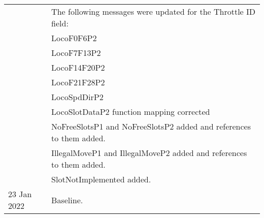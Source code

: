\begin{tabular}{|p{3cm}|p{13cm}|}
& The following messages were updated for the Throttle ID field:\\
&   LocoF0F6P2\\
&   LocoF7F13P2\\
&   LocoF14F20P2\\
&   LocoF21F28P2\\
&   LocoSpdDirP2\\
& LocoSlotDataP2 function mapping corrected\\
& NoFreeSlotsP1 and NoFreeSlotsP2 added and references to them added.\\
& IllegalMoveP1 and IllegalMoveP2 added and references to them added.\\
& SlotNotImplemented added.\\
\hline
23 Jan 2022 & Baseline.\\
\hline
\end{tabular}

